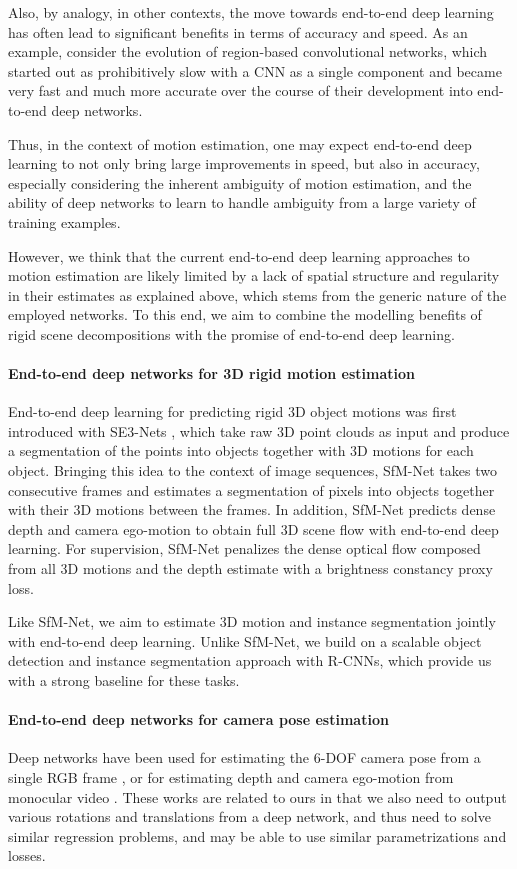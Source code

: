 Also, by analogy, in other contexts, the move towards end-to-end deep learning has often lead
to significant benefits in terms of accuracy and speed.
As an example, consider the evolution of region-based convolutional networks, which started
out as prohibitively slow with a CNN as a single component and
became very fast and much more accurate over the course of their development into
end-to-end deep networks.

Thus, in the context of motion estimation, one may expect end-to-end deep learning to not only bring large improvements
in speed, but also in accuracy, especially considering the inherent ambiguity of motion estimation,
and the ability of deep networks to learn to handle ambiguity from a large variety of training examples.

However, we think that the current end-to-end deep learning approaches to motion
estimation are likely limited by a lack of spatial structure and regularity in their estimates
as explained above, which stems from the generic nature of the employed networks.
To this end, we aim to combine the modelling benefits of rigid scene decompositions
with the promise of end-to-end deep learning.

\paragraph{End-to-end deep networks for 3D rigid motion estimation}
End-to-end deep learning for predicting rigid 3D object motions was first introduced with
SE3-Nets \cite{SE3Nets}, which take raw 3D point clouds as input and produce a segmentation
of the points into objects together with 3D motions for each object.
Bringing this idea to the context of image sequences, SfM-Net \cite{SfmNet} takes two consecutive frames and
estimates a segmentation of pixels into objects together with their 3D motions between the frames.
In addition, SfM-Net predicts dense depth and camera ego-motion to obtain full 3D scene flow with end-to-end deep learning.
For supervision, SfM-Net penalizes the dense optical flow composed from all 3D motions and the depth estimate
with a brightness constancy proxy loss.

Like SfM-Net, we aim to estimate 3D motion and instance segmentation jointly with
end-to-end deep learning.
Unlike SfM-Net, we build on a scalable object detection and instance segmentation
approach with R-CNNs, which provide us with a strong baseline for these tasks.

\paragraph{End-to-end deep networks for camera pose estimation}
Deep networks have been used for estimating the 6-DOF camera pose from
a single RGB frame \cite{PoseNet, PoseNet2}, or for estimating depth and camera ego-motion
from monocular video \cite{UnsupPoseDepth}.
These works are related to
ours in that we also need to output various rotations and translations from a deep network,
and thus need to solve similar regression problems,
and may be able to use similar parametrizations and losses.


